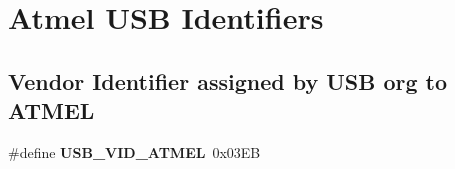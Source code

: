 \hypertarget{group__usb__atmel__ids__group}{}\section{Atmel U\+SB Identifiers}
\label{group__usb__atmel__ids__group}
\subsection*{Vendor Identifier assigned by U\+SB org to A\+T\+M\+EL}
\begin{DoxyCompactItemize}
\item 
\mbox{\label{group__usb__atmel__ids__group_ga743cf21f96dd33b647482be549c304f7}} 
\#define {\bfseries U\+S\+B\+\_\+\+V\+I\+D\+\_\+\+A\+T\+M\+EL}~0x03\+EB
\end{DoxyCompactItemize}

